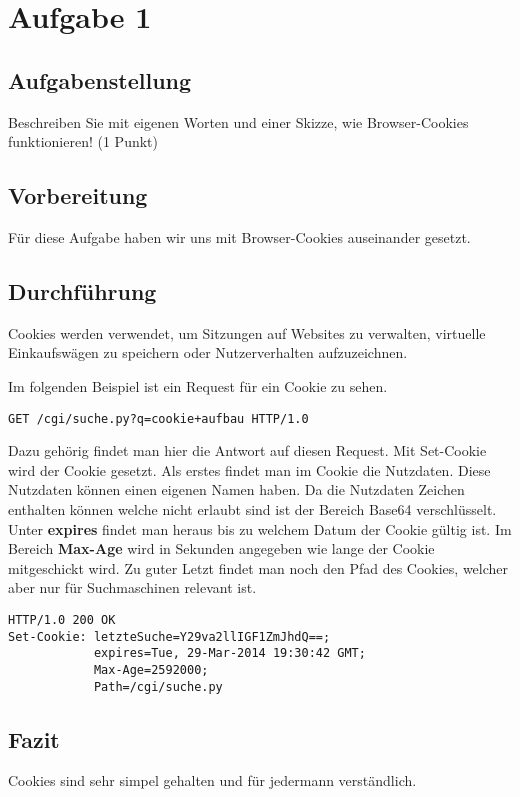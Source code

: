 \newpage

\section{Aufgabe 1}

\subsection{Aufgabenstellung}
Beschreiben Sie mit eigenen Worten und einer Skizze, wie Browser-Cookies funktionieren!
(1 Punkt)

\subsection{Vorbereitung}
Für diese Aufgabe haben wir uns mit Browser-Cookies auseinander gesetzt.

\subsection{Durchführung}
Cookies werden verwendet, um Sitzungen auf Websites zu verwalten, virtuelle Einkaufswägen zu speichern oder Nutzerverhalten aufzuzeichnen.

Im folgenden Beispiel ist ein Request für ein Cookie zu sehen.
\begin{lstlisting}
GET /cgi/suche.py?q=cookie+aufbau HTTP/1.0
\end{lstlisting}

Dazu gehörig findet man hier die Antwort auf diesen Request. Mit Set-Cookie wird der Cookie gesetzt. Als erstes findet man im Cookie die Nutzdaten. Diese Nutzdaten können einen eigenen Namen haben. Da die Nutzdaten Zeichen enthalten können welche nicht erlaubt sind ist der Bereich Base64 verschlüsselt. Unter \textbf{expires} findet man heraus bis zu welchem Datum der Cookie gültig ist. Im Bereich \textbf{Max-Age} wird in Sekunden angegeben wie lange der Cookie mitgeschickt wird. Zu guter Letzt findet man noch den Pfad des Cookies, welcher aber nur für Suchmaschinen relevant ist.
\begin{lstlisting}
HTTP/1.0 200 OK
Set-Cookie: letzteSuche=Y29va2llIGF1ZmJhdQ==;
			expires=Tue, 29-Mar-2014 19:30:42 GMT;
			Max-Age=2592000;
			Path=/cgi/suche.py
\end{lstlisting}

\subsection{Fazit}
Cookies sind sehr simpel gehalten und für jedermann verständlich.

